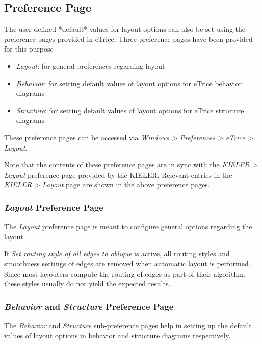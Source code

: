 \subsection{\label{preferencePage}Preference Page}

The user-defined *default* values for layout options can also be set using the preference pages provided 
in eTrice. Three preference pages have been provided for this purpose
\begin{itemize}
\item \textit{Layout}: for general preferences regarding layout
\item \textit{Behavior}: for setting default values of layout options for eTrice behavior diagrams
\item \textit{Structure}: for setting default values of layout options for eTrice structure diagrams
\end{itemize}

These preference pages can be accessed via \textit{Windows > Preferences > eTrice > Layout}.

Note that the contents of these preference pages are in sync with the \textit{KIELER > Layout} preference 
page provided by the KIELER. Relevant entries in the \textit{KIELER > Layout} page are shown in the above 
preference pages.

\subsubsection{\textit{Layout} Preference Page}

The \textit{Layout} preference page is meant to configure general options regarding the layout. 

If \textit{Set routing style of all edges to oblique} is active, all routing styles and smoothness 
settings of edges are removed when automatic layout is performed. Since most layouters compute the routing 
of edges as part of their algorithm, these styles usually do not yield the expected results.

\subsubsection{\textit{Behavior} and \textit{Structure} Preference Page}

The \textit{Behavior} and \textit{Structure} sub-preference pages help in setting up the default values of 
layout options in behavior and structure diagrams respectively.

